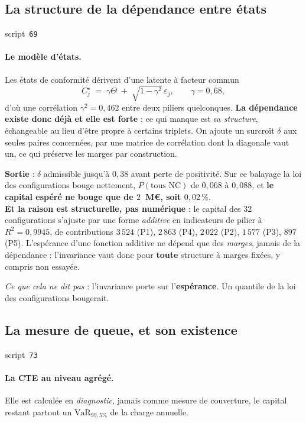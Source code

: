 \documentclass[11pt,a4paper]{article}
\newcommand{\src}[1]{\hfill{\footnotesize\textsf{script~\texttt{#1}}}}
\begin{document}
\subsection*{La structure de la dépendance entre états}
\src{\texttt{69}}

\paragraph{Le modèle d'états.} Les états de conformité dérivent d'une latente à facteur commun
\begin{equation}
C^\star_j \;=\; \gamma \Theta \;+\; \sqrt{1 - \gamma^2}\, \varepsilon_j,
\qquad \gamma = 0{,}68,
\end{equation}
d'où une corrélation $\gamma^2 = 0{,}462$ entre deux piliers quelconques. \textbf{La dépendance
existe donc déjà et elle est forte} ; ce qui manque est sa \emph{structure}, échangeable au lieu
d'être propre à certains triplets. On ajoute un surcroît $\delta$ aux seules paires concernées,
par une matrice de corrélation dont la diagonale vaut un, ce qui préserve les marges par
construction.

\begin{res}
\textbf{Sortie} : $\delta$ admissible jusqu'à $0{,}38$ avant perte de positivité. Sur ce
balayage la loi des configurations bouge nettement, $P(\text{tous NC})$ de $0{,}068$ à $0{,}088$,
et \textbf{le capital espéré ne bouge que de $2$~M\euro, soit $0{,}02\,\%$}.\\
\textbf{Et la raison est structurelle, pas numérique} : le capital des $32$ configurations
s'ajuste par une forme \emph{additive} en indicateurs de pilier à $R^2 = 0{,}9945$, de
contributions $3\,524$ (P1), $2\,863$ (P4), $2\,022$ (P2), $1\,577$ (P3), $897$ (P5). L'espérance
d'une fonction additive ne dépend que des \emph{marges}, jamais de la dépendance : l'invariance
vaut donc pour \textbf{toute} structure à marges fixées, y compris non essayée.
\end{res}

\noindent\emph{Ce que cela ne dit pas} : l'invariance porte sur l'\textbf{espérance}. Un quantile
de la loi des configurations bougerait.

\subsection*{La mesure de queue, et son existence}
\src{\texttt{73}}

\paragraph{La CTE au niveau agrégé.} Elle est calculée en \emph{diagnostic}, jamais comme mesure
de couverture, le capital restant partout un $\mathrm{VaR}_{99,5\%}$ de la charge annuelle.
\end{document}
